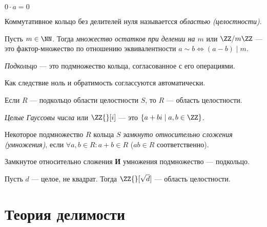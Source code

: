 \documentclass[12pt,a4paper]{article}
\begin{document}
    \begin{lemma*}
        $0 \cdot a = 0$
    \end{lemma*}

    \begin{definition}
        Коммутативное кольцо без делителей нуля называетсся \emph{областью (целостности)}.
    \end{definition}

    \begin{definition}
        Пусть $m\in\NN$. Тогда \emph{множество остатков при делении на $m$} или $\ZZ/m\ZZ$ --- это фактор-множество по отношению эквивалентности $a\sim b \Leftrightarrow (a-b) \mid m$.
    \end{definition}

    \begin{definition}
        \emph{Подкольцо} --- это подмножество кольца, согласованное с его операциями.

        Как следствие ноль и обратимость соглассуются автоматически.
    \end{definition}

    \begin{statement}
        Если $R$ --- подкольцо области целостности $S$, то $R$ --- область целостности.
    \end{statement}

    \begin{definition}
        \emph{Целые Гауссовы числа} или $\ZZ{}[i]$ --- это $\{a + bi \mid a, b \in \ZZ\}$.
    \end{definition}

    \begin{definition}
        Некоторое подмножество $R$ кольца $S$ \emph{замкнуто относительно сложения (умножения)}, если $\forall a, b \in R: a + b \in R$ ($ab \in R$ соответственно).
    \end{definition}

    \begin{remark}
        Замкнутое относительно сложения \textbf{И} умножения подмножество --- подкольцо.
    \end{remark}

    \begin{example}
        Пусть $d$ --- целое, не квадрат. Тогда $\ZZ{}[\sqrt{d}]$ --- область целостности.
    \end{example}

    \section{Теория делимости}
\end{document}
